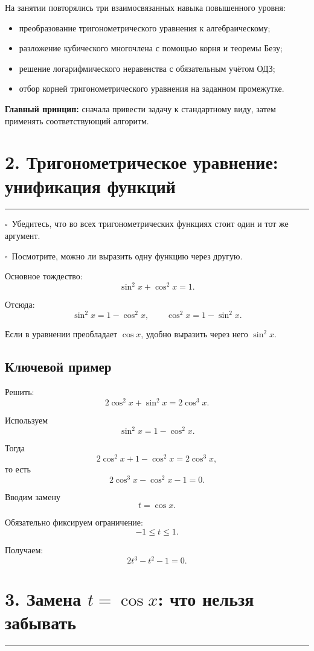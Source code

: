 \documentclass[a4paper,12pt]{article}
\newcommand{\sectionline}{%
    \vspace{0.2em}
    \noindent\color{linegray}\rule{\linewidth}{0.6pt}
    \vspace{0.4em}
}
\newcommand{\checkitem}{\(\square\)\ }
\begin{document}
На занятии повторялись три взаимосвязанных навыка повышенного уровня:

\begin{itemize}
    \item преобразование тригонометрического уравнения к алгебраическому;
    \item разложение кубического многочлена с помощью корня и теоремы Безу;
    \item решение логарифмического неравенства с обязательным учётом ОДЗ;
    \item отбор корней тригонометрического уравнения на заданном промежутке.
\end{itemize}

\textbf{Главный принцип:} сначала привести задачу к стандартному виду, затем применять соответствующий алгоритм.

\section*{\color{darkaccent}2. Тригонометрическое уравнение: унификация функций}
\sectionline

\checkitem Убедитесь, что во всех тригонометрических функциях стоит один и тот же аргумент.

\checkitem Посмотрите, можно ли выразить одну функцию через другую.

Основное тождество:
\[
\sin^2 x+\cos^2 x=1.
\]

Отсюда:
\[
\sin^2 x=1-\cos^2 x,
\qquad
\cos^2 x=1-\sin^2 x.
\]

Если в уравнении преобладает \(\cos x\), удобно выразить через него \(\sin^2x\).

\subsection*{\color{accent}Ключевой пример}

Решить:
\[
2\cos^2x+\sin^2x=2\cos^3x.
\]

Используем
\[
\sin^2x=1-\cos^2x.
\]

Тогда
\[
2\cos^2x+1-\cos^2x=2\cos^3x,
\]
то есть
\[
2\cos^3x-\cos^2x-1=0.
\]

Вводим замену
\[
t=\cos x.
\]

Обязательно фиксируем ограничение:
\[
-1\le t\le1.
\]

Получаем:
\[
2t^3-t^2-1=0.
\]

\section*{\color{darkaccent}3. Замена \(t=\cos x\): что нельзя забывать}
\sectionline
\end{document}
